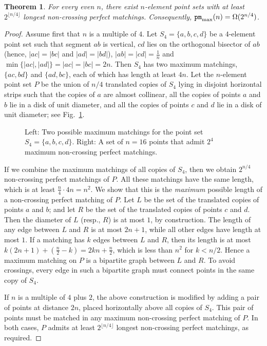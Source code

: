 \documentclass[11pt]{article}
\newtheorem{theorem}{Theorem}
\def\pm{{\tt pm}}
\begin{document}
\begin{theorem} \label{T2}
For every even $n$, there exist $n$-element point sets with
at least $2^{\lfloor n/4\rfloor}$ longest non-crossing
perfect matchings. Consequently, $\pm_{\rm max}(n) =\Omega(2^{n/4})$.
\end{theorem}
\begin{proof}
Assume first that $n$ is a multiple of $4$.
Let $S_4=\{a,b,c,d\}$ be a $4$-element point set such that segment
$ab$ is vertical, $cd$ lies on the orthogonal bisector of $ab$ (hence,
$|ac|=|bc|$ and $|ad|=|bd|$), $|ab|=|cd|=\frac{1}{n}$ and
$\min\{|ac|,|ad|\}=|ac|=|bc|=2n$.
Then $S_4$ has two maximum matchings, $\{ac,bd\}$ and $\{ad,bc\}$, each of which
has length at least $4n$.
Let the $n$-element point set $P$ be the union of $n/4$ translated copies of $S_4$
lying in disjoint horizontal strips such that the copies of $a$ are
almost collinear, all the copies of points $a$ and $b$ lie in a disk
of unit diameter, and all the copies of points $c$ and $d$ lie in a disk
of unit diameter; see Fig.~\ref{fig:longmatching}.
\begin{figure}[htbp]
\centerline{\epsfxsize=5.5in }
\caption{Left: Two possible maximum matchings for the point set
  $S_4=\{a,b,c,d\}$. Right: A set of $n=16$ points that admit $2^4$
  maximum non-crossing perfect matchings.}
\label{fig:longmatching}
\end{figure}

If we combine the maximum matchings of all copies of $S_4$, then we obtain
$2^{n/4}$ non-crossing perfect matchings of $P$. All these matchings
have the same length,
which is at least $\frac{n}{4}\cdot 4n=n^2$. We show that this is the
{\em maximum} possible length of a non-crossing perfect matching of $P$.
Let $L$ be the set of the translated copies of points $a$ and $b$; and
let $R$ be the set of the translated copies of points $c$ and $d$.
Then the diameter of $L$ (resp., $R$) is at most $1$, by
construction. The length of any edge between $L$ and $R$ is at most
$2n+1$, while all other edges have length at most $1$.
If a matching has $k$ edges between $L$ and $R$, then its length is at most
$k(2n+1)+(\frac{n}{2}-k)=2kn+\frac{n}{2}$, which is less than $n^2$ for
$k<n/2$. Hence a maximum matching on $P$ is a bipartite graph between $L$ and
$R$. To avoid crossings, every edge in such a bipartite graph
must connect points in the same copy of $S_4$.

If $n$ is a multiple of $4$ plus $2$, the above construction is
modified by adding a pair of points at distance $2n$, placed
horizontally above all copies of $S_4$. This pair of points must be
matched in any maximum non-crossing perfect matching of $P$.
In both cases, $P$ admits at least $2^{\lfloor n/4\rfloor}$ longest non-crossing
perfect matchings, as required.
\end{proof}
\end{document}
